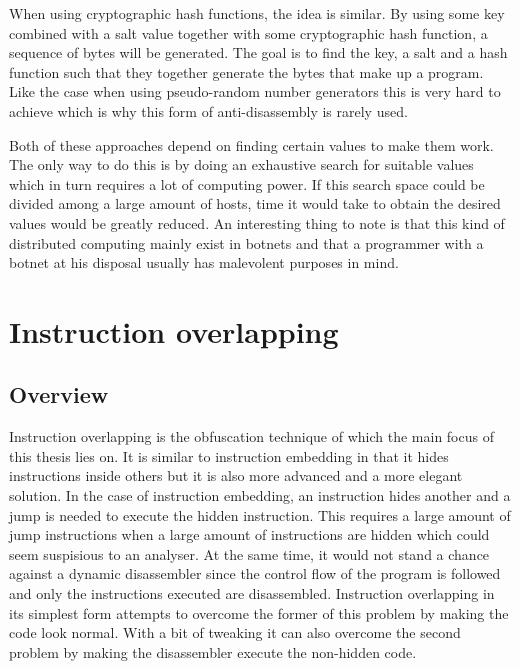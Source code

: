 \documentclass[11pt,twoside]{eitExjobb}
\begin{document}
When using cryptographic hash functions, the idea is similar. By using some key combined with a salt value together with some cryptographic hash function, a sequence of bytes will be generated. The goal is to find the key, a salt and a hash function such that they together generate the bytes that make up a program. Like the case when using pseudo-random number generators this is very hard to achieve which is why this form of anti-disassembly is rarely used.\cite{chf}

Both of these approaches depend on finding certain values to make them work. The only way to do this is by doing an exhaustive search for suitable values which in turn requires a lot of computing power. If this search space could be divided among a large amount of hosts, time it would take to obtain the desired values would be greatly reduced. An interesting thing to note is that this kind of distributed computing mainly exist in botnets and that a programmer with a botnet at his disposal usually has malevolent purposes in mind. 


\chapter{Instruction overlapping}
\section{Overview}
Instruction overlapping is the obfuscation technique of which the main focus of this thesis lies on. It is similar to instruction embedding in that it hides instructions inside others but it is also more advanced and a more elegant solution. In the case of instruction embedding, an instruction hides another and a jump is needed to execute the hidden instruction. This requires a large amount of jump instructions when a large amount of instructions are hidden which could seem suspisious to an analyser. At the same time, it would not stand a chance against a dynamic disassembler since the control flow of the program is followed and only the instructions executed are disassembled. Instruction overlapping in its simplest form attempts to overcome the former of this problem by making the code look normal. With a bit of tweaking it can also overcome the second problem by making the disassembler execute the non-hidden code.
\end{document}
